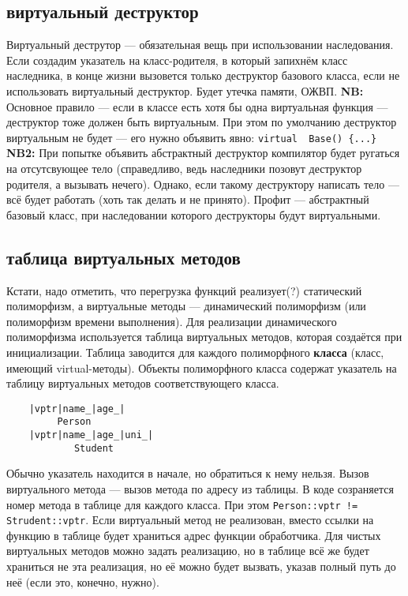 \documentclass[15pt, a4paper]{article}
\newcommand{\nl}{\newline}
\begin{document}
\subsection{виртуальный деструктор}
Виртуальный деструтор --- обязательная вещь при использовании наследования. Если создадим указатель на 
класс-родителя, в который запихнём класс наследника, в конце жизни вызовется только деструктор базового 
класса, если не использовать виртуальный деструктор. Будет утечка памяти, ОЖВП. \nl
\textbf{NB:} Основное правило --- если в классе есть хотя бы одна виртуальная функция --- деструктор тоже должен быть виртуальным.
При этом по умолчанию деструктор виртуальным не будет --- его нужно объявить явно: \texttt{virtual ~Base() \{...\}} \nl
\textbf{NB2:} При попытке объявить абстрактный деструктор компилятор будет ругаться на отсутсвующее тело (справедливо, ведь наследники позовут деструктор родителя, а вызывать нечего).
Однако, если такому деструктору написать тело --- всё будет работать (хоть так делать и не принято). Профит --- абстрактный базовый класс, при наследовании которого деструкторы будут виртуальными.
\subsection{таблица виртуальных методов}
Кстати, надо отметить, что перегрузка функций реализует(?) статический полиморфизм, а виртуальные методы 
 --- динамический полиморфизм (или полиморфизм времени выполнения).\nl
Для реализации динамического полиморфизма используется таблица виртуальных методов, которая создаётся 
при инициализации. Таблица заводится для каждого полиморфного \textbf{класса} (класс, имеющий virtual-методы). 
Объекты полиморфного класса содержат указатель на таблицу виртуальных методов соответствующего класса.
\begin{verbatim}
    |vptr|name_|age_|
         Person
    |vptr|name_|age_|uni_|
            Student
\end{verbatim}
Обычно указатель находится в начале, но обратиться к нему нельзя.\nl
Вызов виртуального метода --- вызов метода по адресу из таблицы. В коде созраняется номер метода в таблице
для каждого класса. При этом \texttt{Person::vptr != Strudent::vptr}. Если виртуальный метод не реализован, 
вместо ссылки на функцию в таблице будет храниться адрес функции обработчика.\nl
Для чистых виртуальных методов можно задать реализацию, но в таблице всё же будет храниться не эта 
реализация, но её можно будет вызвать, указав полный путь до неё (если это, конечно, нужно).
\end{document}

